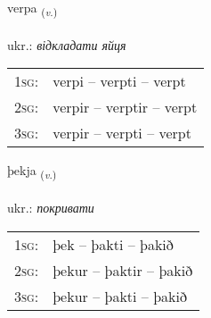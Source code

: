 \documentclass[frontgrid, backgrid]{flacards}\usepackage[]{graphicx}\usepackage[]{xcolor}
\begin{document}
\renewcommand{\flhead}{\vskip5pt \fboxsep=0pt {\small\bfseries\footnotesize Sagnorð | дієслово}}
\renewcommand{\fcfoot}{\vskip5pt \fboxsep=0pt \hspace{2pt}{\small\bfseries\footnotesize 3K}}

\renewcommand{\blhead}{\vskip5pt {\small\bfseries\footnotesize Sagnorð | дієслово }}
\renewcommand{\bcfoot}{\vskip5pt \hspace{2pt}{\small\bfseries\footnotesize 3K}}


{verpa \small{\textsubscript{(\textit{v.})}} \\[1ex] %
\textphonetic{[vɛr̥pa]} \\
ukr.: \emph{відкладати яйця} \\  [2ex]
\renewcommand*{\arraystretch}{0.8}
\begin{tabular}{p{1cm}l}
\textsc{1sg}: & verpi -- verpti -- verpt \\ 
\textsc{2sg}: & verpir -- verptir -- verpt \\ 
\textsc{3sg}: & verpir -- verpti -- verpt \\ 
\end{tabular}
}

\renewcommand{\flhead}{\vskip5pt \fboxsep=0pt {\small\bfseries\footnotesize Sagnorð | дієслово}}
\renewcommand{\fcfoot}{\vskip5pt \fboxsep=0pt \hspace{2pt}{\small\bfseries\footnotesize 3K}}

\renewcommand{\blhead}{\vskip5pt {\small\bfseries\footnotesize Sagnorð | дієслово }}
\renewcommand{\bcfoot}{\vskip5pt \hspace{2pt}{\small\bfseries\footnotesize 3K}}


{þekja \small{\textsubscript{(\textit{v.})}} \\[1ex] %
\textphonetic{[θɛːca]} \\
ukr.: \emph{покривати} \\  [2ex]
\renewcommand*{\arraystretch}{0.8}
\begin{tabular}{p{1cm}l}
\textsc{1sg}: & þek -- þakti -- þakið \\ 
\textsc{2sg}: & þekur -- þaktir -- þakið \\ 
\textsc{3sg}: & þekur -- þakti -- þakið \\ 
\end{tabular}
}
\end{document}
